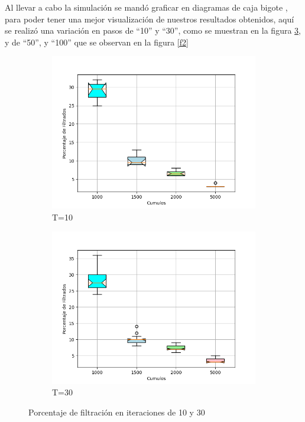 \documentclass{article}
\begin{document}
 Al llevar a cabo la simulaci\'on se mand\'o graficar en diagramas de caja bigote \citep{ana}, para poder tener una mejor visualizaci\'on de nuestros resultados obtenidos, aqu\'i se realiz\'o una variaci\'on en pasos de ``10'' y ``30'', como se muestran en la figura \ref{f1}, y de ``50'', y ``100'' que se observan en la figura \ref{f2}

\begin{figure}
       \centering
       \begin{subfigure}[b]{0.90\linewidth}
           \includegraphics[width=\linewidth]{cumulos10.png}
           \caption{T=10}
           \label{f1.a}
        \end{subfigure}
 \begin{subfigure}[b]{0.90\linewidth}
           \includegraphics[width=\linewidth]{cumulos30.png}
           \caption{T=30}
           \label{f1.b}
        \end{subfigure}
\caption{Porcentaje de filtraci\'on en iteraciones de 10 y 30}
        \label{f1}
\end{figure}
\end{document}
